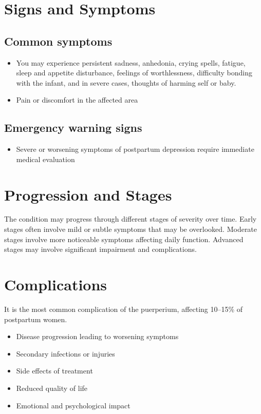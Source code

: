 \section{Signs and Symptoms}
\subsection{Common symptoms}
\begin{itemize}[noitemsep]
  \item You may experience persistent sadness, anhedonia, crying spells, fatigue, sleep and appetite disturbance, feelings of worthlessness, difficulty bonding with the infant, and in severe cases, thoughts of harming self or baby.
  \item Pain or discomfort in the affected area
  \end{itemize}
\subsection{Emergency warning signs}
\begin{itemize}[noitemsep]
  \item Severe or worsening symptoms of postpartum depression require immediate medical evaluation
\end{itemize}
\section{Progression and Stages}
The condition may progress through different stages of severity over time. Early stages often involve mild or subtle symptoms that may be overlooked. Moderate stages involve more noticeable symptoms affecting daily function. Advanced stages may involve significant impairment and complications.
\section{Complications}
It is the most common complication of the puerperium, affecting 10--15\% of postpartum women.

\begin{itemize}[noitemsep]
  \item Disease progression leading to worsening symptoms
  \item Secondary infections or injuries
  \item Side effects of treatment
  \item Reduced quality of life
  \item Emotional and psychological impact
\end{itemize}
